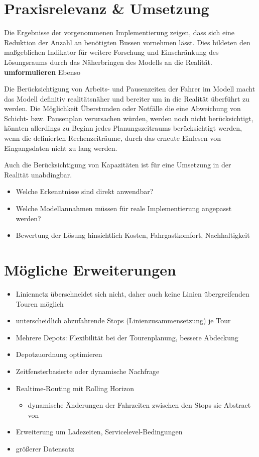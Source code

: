 \section{Praxisrelevanz \& Umsetzung}
Die Ergebnisse der vorgenommenen Implementierung zeigen, dass sich eine Reduktion der Anzahl an benötigten Bussen vornehmen lässt. Dies bildeten den maßgeblichen Indikator für weitere Forschung und Einschränkung des Lösungsraums durch das Näherbringen des Modells an die Realität. \textbf{umformulieren} Ebenso 

Die Berücksichtigung von Arbeits- und Pausenzeiten der Fahrer im Modell macht das Modell definitiv realitätsnäher und bereiter um in die Realität überführt zu werden. Die Möglichkeit Überstunden oder Notfälle die eine Abweichung von Schicht- bzw. Pausenplan verursachen würden, werden noch nicht berücksichtigt, könnten allerdings zu Beginn jedes Planungszeitraums berücksichtigt werden, wenn die definierten Rechenzeiträume, durch das erneute Einlesen von Eingangsdaten nicht zu lang werden.

Auch die Berücksichtigung von Kapazitäten ist für eine Umsetzung in der Realität unabdingbar.

\begin{itemize}
    \item Welche Erkenntnisse sind direkt anwendbar?
    \item Welche Modellannahmen müssen für reale Implementierung angepasst werden?
    \item Bewertung der Lösung hinsichtlich Kosten, Fahrgastkomfort, Nachhaltigkeit
\end{itemize}

\section{Mögliche Erweiterungen}
\begin{itemize}
    \item Liniennetz überschneidet sich nicht, daher auch keine Linien übergreifenden Touren möglich
    \item unterscheidlich abzufahrende Stops (Linienzusammensetzung) je Tour
    \item Mehrere Depots: Flexibilität bei der Tourenplanung, bessere Abdeckung
    \item Depotzuordnung optimieren
    \item Zeitfensterbasierte oder dynamische Nachfrage
    \item Realtime-Routing mit Rolling Horizon
    \begin{itemize}
        \item dynamische Änderungen der Fahrzeiten zwischen den Stops sie Abstract von \textcite{lian_-demand_2023}
    \end{itemize}
    \item Erweiterung um Ladezeiten, Servicelevel-Bedingungen
    \item größerer Datensatz
\end{itemize}

